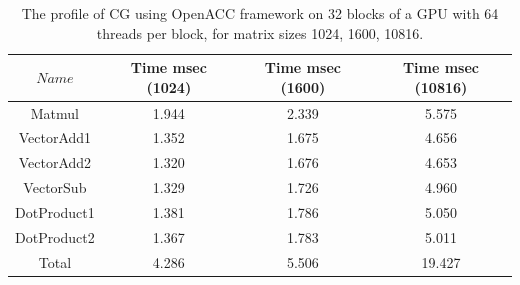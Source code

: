 \documentclass{article}
\begin{document}
\begin{spacing}{1.1}
    
\begin{table}[H]
\begin{center}
 \begin{tabular}{| c | c|c|c|} 
 \hline
$Name$ & Time msec (1024) & Time msec (1600) & Time msec (10816)    \\ %
 \hline
Matmul & 1.944 &  2.339 & 5.575 \\ %
VectorAdd1 & 1.352 &  1.675 & 4.656 \\ %
VectorAdd2 & 1.320 &  1.676 & 4.653 \\ %
VectorSub & 1.329 &  1.726 & 4.960 \\ %
DotProduct1 & 1.381 &  1.786 & 5.050 \\ %
DotProduct2 & 1.367 &  1.783 & 5.011 \\ %
\cline{2-4}
Total & 4.286& 5.506 & 19.427\\%
 \hline
\end{tabular}%
\end{center}
\caption{\label{gpu_profile} The profile of CG using OpenACC framework on 32 blocks of a GPU with 64 threads per block, for matrix sizes 1024, 1600, 10816.   } 
\end{table}
    

\end{spacing}
\end{document}

